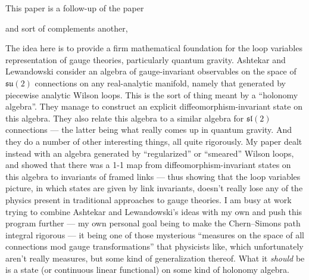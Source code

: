 \documentclass[12pt]{article}
\def\tightlist{}
\renewcommand{\texttt}[1]{%
  \begingroup
  \ttfamily
  \begingroup\lccode`~=`/\lowercase{\endgroup\def~}{/\discretionary{}{}{}}%
  \begingroup\lccode`~=`[\lowercase{\endgroup\def~}{[\discretionary{}{}{}}%
  \begingroup\lccode`~=`.\lowercase{\endgroup\def~}{.\discretionary{}{}{}}%
  \catcode`/=\active\catcode`[=\active\catcode`.=\active
  \scantokens{#1\noexpand}%
  \endgroup
}
\begin{document}
\noindent
This paper is a follow-up of the paper

\noindent
and sort of complements another,


The idea here is to provide a firm mathematical foundation for the loop
variables representation of gauge theories, particularly quantum
gravity. Ashtekar and Lewandowski consider an algebra of gauge-invariant
observables on the space of \(\mathfrak{su}(2)\) connections on any
real-analytic manifold, namely that generated by piecewise analytic
Wilson loops. This is the sort of thing meant by a ``holonomy algebra''.
They manage to construct an explicit diffeomorphism-invariant state on
this algebra. They also relate this algebra to a similar algebra for
\(\mathfrak{sl}(2)\) connections --- the latter being what really comes
up in quantum gravity. And they do a number of other interesting things,
all quite rigorously. My paper dealt instead with an algebra generated
by ``regularized'' or ``smeared'' Wilson loops, and showed that there
was a 1-1 map from diffeomorphism-invariant states on this algebra to
invariants of framed links --- thus showing that the loop variables
picture, in which states are given by link invariants, doesn't really
lose any of the physics present in traditional approaches to gauge
theories. I am busy at work trying to combine Ashtekar and Lewandowski's
ideas with my own and push this program further --- my own personal goal
being to make the Chern--Simons path integral rigorous --- it being one
of those mysterious ``measures on the space of all connections mod gauge
transformations'' that physicists like, which unfortunately aren't
really measures, but some kind of generalization thereof. What it
\emph{should} be is a state (or continuous linear functional) on some
kind of holonomy algebra.
\end{document}
